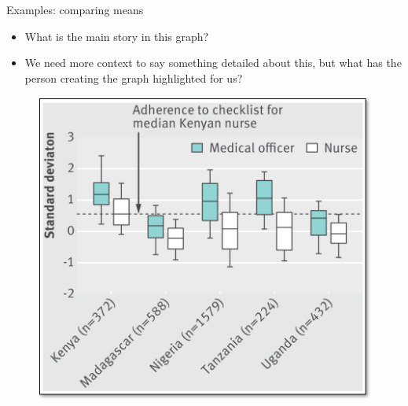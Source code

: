 \documentclass[aspectratio=169]{beamer}
\begin{document}
\begin{frame}[fragile]{Examples: comparing means}
\begin{multicols}{2}	
	\begin{itemize}
		\item What is the main story in this graph? 
		\item We need more context to say something detailed about this, but what has the person creating the graph highlighted for us?
	\end{itemize}
	\begin{figure}
		\centering
		\includegraphics[width=\linewidth]{img/boxplot1}
	\end{figure}
\end{multicols}
\end{frame}
\end{document}
